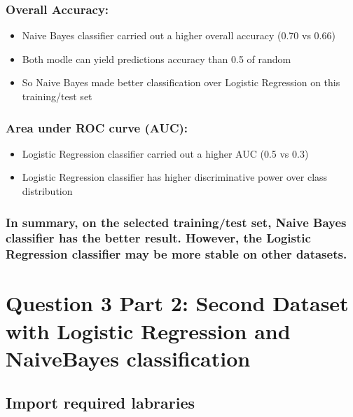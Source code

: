 \documentclass{report}
\providecommand{\tightlist}{%
      \setlength{\itemsep}{0pt}\setlength{\parskip}{0pt}}
\begin{document}
\subsection{Overall Accuracy:}\label{overall-accuracy}

\begin{itemize}
\tightlist
\item
  Naive Bayes classifier carried out a higher overall accuracy (0.70 vs
  0.66)
\item
  Both modle can yield predictions accuracy than 0.5 of random
\item
  So Naive Bayes made better classification over Logistic Regression on
  this training/test set
\end{itemize}

\subsection{Area under ROC curve (AUC):}\label{area-under-roc-curve-auc}

\begin{itemize}
\tightlist
\item
  Logistic Regression classifier carried out a higher AUC (0.5 vs 0.3)
\item
  Logistic Regression classifier has higher discriminative power over
  class distribution
\end{itemize}

\subsection{In summary, on the selected training/test set, Naive Bayes
classifier has the better result. However, the Logistic Regression
classifier may be more stable on other
datasets.}\label{in-summary-on-the-selected-trainingtest-set-naive-bayes-classifier-has-the-better-result.-however-the-logistic-regression-classifier-may-be-more-stable-on-other-datasets.}

\chapter{Question 3 Part 2: Second Dataset with Logistic Regression and
NaiveBayes
classification}\label{question-3-part-2-second-dataset-with-logistic-regression-and-naivebayes-classification}

\section{Import required labraries}\label{import-required-labraries}
\end{document}
